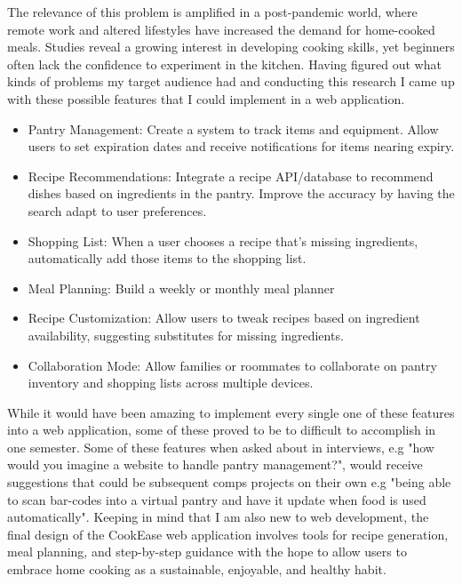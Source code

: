 \documentclass[10pt,twocolumn]{article}
\begin{document}
The relevance of this problem is amplified in a post-pandemic world, where remote work and altered lifestyles have increased the demand for home-cooked meals. Studies reveal a growing interest in developing cooking skills, yet beginners often lack the confidence to experiment in the kitchen. Having figured out what kinds of problems my target audience had and conducting this research I came up with these possible features that I could implement in a web application.
\begin{itemize}
    \item Pantry Management: Create a system to track items and equipment. Allow users to set expiration dates and receive notifications for items nearing expiry.
    
    \item Recipe Recommendations: Integrate a recipe API/database to recommend dishes based on ingredients in the pantry. Improve the accuracy by having the search adapt to user preferences.
    
    \item Shopping List: When a user chooses a recipe that’s missing ingredients, automatically add those items to the shopping list. 
    
    \item Meal Planning: Build a weekly or monthly meal planner 
    
    \item Recipe Customization: Allow users to tweak recipes based on ingredient availability, suggesting substitutes for missing ingredients.
    
    \item Collaboration Mode: Allow families or roommates to collaborate on pantry inventory and shopping lists across multiple devices.
\end{itemize}
While it would have been amazing to implement every single one of these features into a web application, some of these proved to be to difficult to accomplish in one semester. Some of these features when asked about in interviews, e.g "how would you imagine a website to handle pantry management?", would receive suggestions that could be subsequent comps projects on their own e.g "being able to scan bar-codes into a virtual pantry and have it update when food is used automatically". Keeping in mind that I am also new to web development, the final design of the CookEase web application involves tools for recipe generation, meal planning, and step-by-step guidance with the hope to allow users to embrace home cooking as a sustainable, enjoyable, and healthy habit.  
\end{document}
